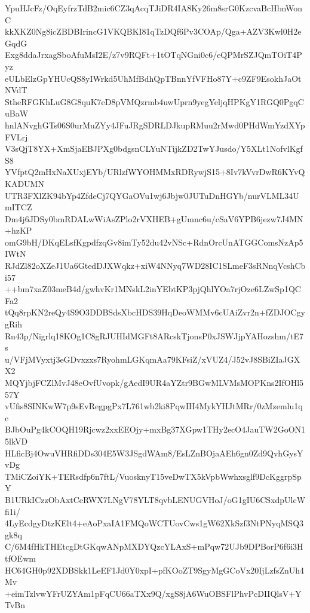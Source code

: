 YpuHJcFz/OqEyfrzTdB2mic6CZ3qAcqTJiDR4IA8Ky26m8srG0KzcvaBcHbnWonC
kkXKZ0Ng8icZBDBIrincG1VKQBKI81qTzDQf6Pv3COAp/Qga+AZV3Kwl0H2eGqdG
Exg8ddaJrxagSboAfuMsI2E/z7v9RQFt+1tOTqNGni0c6/eQPMrSZJQmTOiT4Pyz
eULbElzGpYHUcQS8yIWrkd5UhMfBdhQpTBnnYfVFHo87Y+c9ZF9EsokhJaOtNVdT
StheRFGKhLuG8G8quK7eD8pVMQzrmb4uwUprn9yegYeljqHPKgY1RGQ0PgqCuBaW
hnlANvghGTs06S0urMuZYy4JFuJRgSDRLDJkupRMuu2rMwd0PHdWmYzdXYpFVLrj
V3sQjT8YX+XmSjaEBJPXg0bdgsnCLYuNTijkZD2TwYJusdo/Y5XLt1NofvlKgfS8
YVfptQ2mHxNaXUxjEYb/URlzfWYOHMMxRDRywjS15+8Iv7kVvrDwR6KYvQKADUMN
UTR3FXlZK94bYp4ZfdeCj7QYGaOVu1wj6Jbjw0JUTuDnHGYb/nurVLML34UmITCZ
Dm4j6JDSy0bmRDALwWiAsZPlo2rVXHEB+gUmnc6u/cSaV6YPB6jezw7J4MN+hzKP
omG9bH/DKqELsfKgpdfzqGv8imTy52du42vNSc+RdnOrcUnATGGComsNzAp5IWtN
RJdZl82oXZeJ1Ua6GtedDJXWqkz+xiW4NNyq7WD28IC1SLmeF3sRNnqVcshCbi57
++bm7xaZ03meB4d/gwhvKr1MNskL2inYEbtKP3pjQhlYOa7rjOze6LZwSp1QCFa2
tQq8rpKN2reQy4S9O3DDBSdsXbcHDS39HqDeoWMMv6cUAiZvr2n+fZDJOCgygRih
Ru43p/Nigrlq18KOg1C8gRJUHIdMGFt8ARcskTjonsP0xJSWJjpYAHozshm/tE7s
u/VFjMVyxtj3eGDvxzxs7RyohmLGKqmAa79KFsiZ/xVUZ4/J52vJ8SBiZIaJGXX2
MQYjbjFCZlMvJ48eOvfUvopk/gAedI9UR4aYZtr9BGwMLVMsMOPKns2IfOHl557Y
vUfis8SINKwW7p9sEvRegpgPx7L761wb2ki8PqwIH4MykYHJtMRr/0zMzemlu1qc
BJbOuPg4kCOQH19Rjcwz2xxEEOjy+mxBg37XGpw1THy2ecO4JauTW2GoON15lkVD
HLficBj4OwuVHRfiDDs304E5W3JSgdWAm8/EsLZnBOjaAEh6gn0Zd9QvhGysYvDg
TMiCZoiYK+TERsdfp6n7ftL/VuosknyT15veDwTX5kVpbWwhxsglf9DcKggrpSpY
B1URkICzzObAxtCeRWX7LNgV78YLT8qvbLENUGVHoJ/oG1gIU6CSxdpUlcWfi1i/
4LyEcdgyDtzKElt4+eAoPxaIA1FMQoWCTUovCws1gW62XkSzf3NtPNyqMSQ3gk8q
C/6M4fHkTHEtcgDtGKqwANpMXDYQzcYLAxS+mPqw72UJb9DPBorP6f6i3HtfOEwm
HC64GH0p92XDBSkk1LeEF1Jd0Y0xpI+pfKOoZT9SgyMgGCoVx20IjLzfsZnUh4Mv
+eimTzlvwYFrUZYAm1pFqCU66aTXx9Q/xgS8jA6WuOBSFlPhvPcDIIQlsV+YTvBn
